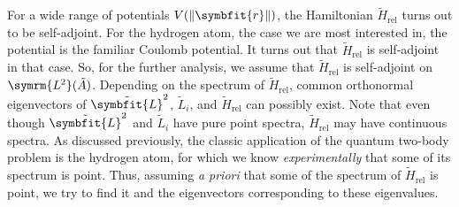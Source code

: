 \documentclass[12pt, a4 paper]{article}
\theoremstyle{definition}
\newcommand{\ltwo}{\symrm{L\kern-0.3pt^2}}
\newcommand{\rvec}{\symbfit{r}}
\newcommand{\lvecsquare}{\tilde{\symbfit{L}}^2}
\newcommand{\hrel}{\tilde{H}_\text{rel}}
\newcommand{\ltwoa}{\ltwo(\tilde{A})}
\DeclarePairedDelimiter{\norm}{\lVert}{\rVert}
\begin{document}
    For a wide range of potentials \(V(\norm{\rvec})\), the Hamiltonian \(\hrel\) turns out to be self-adjoint. For the hydrogen atom, the case we are most interested in, the potential is the familiar Coulomb potential. It turns out that \(\hrel\) is self-adjoint in that case. So, for the further analysis, we assume that \(\hrel\) is self-adjoint on \(\ltwoa\). Depending on the spectrum of \(\hrel\), common orthonormal eigenvectors of \(\lvecsquare\), \(\tilde{L}_i\), and \(\hrel\) can possibly exist. Note that even though \(\lvecsquare\) and \(\tilde{L}_i\) have pure point spectra, \(\hrel\) may have continuous spectra. As discussed previously, the classic application of the quantum two-body problem is the hydrogen atom, for which we know \textit{experimentally} that some of its spectrum is point. Thus, assuming \textit{a priori} that some of the spectrum of \(\hrel\) is point, we try to find it and the eigenvectors corresponding to these eigenvalues.
\end{document}
